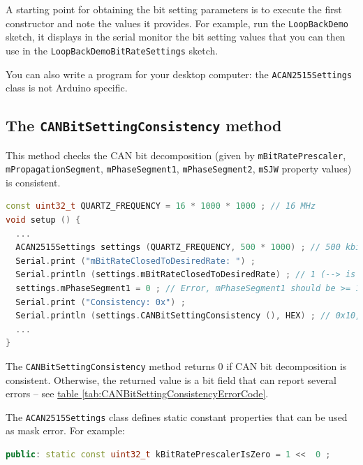 \documentclass[10pt, a4paper, obeyspaces]{extarticle}
\newcommand \subsectionLabel[2]{\subsection{#1}\label{subsec:#2}}
\newcommand\refTableau[1]{\hyperref[tab:#1]{table \ref*{tab:#1}}}
\begin{document}
A starting point for obtaining the bit setting parameters is to execute the first constructor and note the values it provides. For example, run the \texttt{LoopBackDemo} sketch, it displays in the serial monitor the bit setting values that you can then use in the \texttt{LoopBackDemoBitRateSettings} sketch.

You can also write a program for your desktop computer: the \texttt{ACAN2515Settings} class is not Arduino specific.





\subsectionLabel{The \texttt{CANBitSettingConsistency} method}{CANBitSettingConsistency}

This method checks the CAN bit decomposition (given by \texttt{mBitRatePrescaler}, \texttt{mPropagationSegment}, \texttt{mPhaseSegment1}, \texttt{mPhaseSegment2}, \texttt{mSJW} property values) is consistent.

{ \small\begin{lstlisting}[language=c++]
const uint32_t QUARTZ_FREQUENCY = 16 * 1000 * 1000 ; // 16 MHz
void setup () {
  ...
  ACAN2515Settings settings (QUARTZ_FREQUENCY, 500 * 1000) ; // 500 kbit/s
  Serial.print ("mBitRateClosedToDesiredRate: ") ;
  Serial.println (settings.mBitRateClosedToDesiredRate) ; // 1 (--> is true)
  settings.mPhaseSegment1 = 0 ; // Error, mPhaseSegment1 should be >= 1 (and <= 8)
  Serial.print ("Consistency: 0x") ;
  Serial.println (settings.CANBitSettingConsistency (), HEX) ; // 0x10, meaning error
  ...
}
\end{lstlisting}}

The \texttt{CANBitSettingConsistency} method returns $0$ if CAN bit decomposition is consistent. Otherwise, the returned value is a bit field that can report several errors -- see \refTableau{CANBitSettingConsistencyErrorCode}.


The \texttt{ACAN2515Settings} class defines static constant properties that can be used as mask error. For example:
{ \small\begin{lstlisting}[language=c++]
public: static const uint32_t kBitRatePrescalerIsZero = 1 <<  0 ;
\end{lstlisting}}
\end{document}
